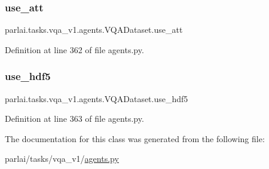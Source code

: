 \subsubsection{\texorpdfstring{use\+\_\+att}{use\_att}}
{\footnotesize\ttfamily parlai.\+tasks.\+vqa\+\_\+v1.\+agents.\+V\+Q\+A\+Dataset.\+use\+\_\+att}



Definition at line 362 of file agents.\+py.

\mbox{\label{classparlai_1_1tasks_1_1vqa__v1_1_1agents_1_1VQADataset_a910f7bdc353cc316e3111ec610fe72de}} 
\subsubsection{\texorpdfstring{use\+\_\+hdf5}{use\_hdf5}}
{\footnotesize\ttfamily parlai.\+tasks.\+vqa\+\_\+v1.\+agents.\+V\+Q\+A\+Dataset.\+use\+\_\+hdf5}



Definition at line 363 of file agents.\+py.



The documentation for this class was generated from the following file\+:\begin{DoxyCompactItemize}
\item 
parlai/tasks/vqa\+\_\+v1/\hyperlink{parlai_2tasks_2vqa__v1_2agents_8py}{agents.\+py}\end{DoxyCompactItemize}
